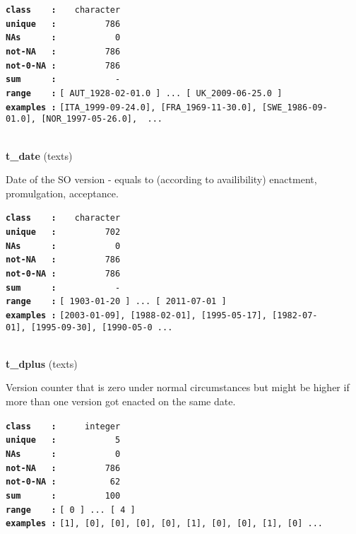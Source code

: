 \documentclass[]{article}
\begin{document}
\textbf{\texttt{class\ \ \ \ :}} \texttt{~~~character}\\
\textbf{\texttt{unique\ \ \ :}} \texttt{~~~~~~~~~786}\\
\textbf{\texttt{NAs\ \ \ \ \ \ :}} \texttt{~~~~~~~~~~~0}\\
\textbf{\texttt{not-NA\ \ \ :}} \texttt{~~~~~~~~~786}\\
\textbf{\texttt{not-0-NA\ :}} \texttt{~~~~~~~~~786}\\
\textbf{\texttt{sum\ \ \ \ \ \ :}} \texttt{~~~~~~~~~~~-}\\
\textbf{\texttt{range\ \ \ \ :}}
\texttt{{[}\ AUT\_1928-02-01.0\ {]}\ ...\ {[}\ UK\_2009-06-25.0\ {]}}\\
\textbf{\texttt{examples\ :}}
\texttt{{[}ITA\_1999-09-24.0{]},\ {[}FRA\_1969-11-30.0{]},\ {[}SWE\_1986-09-01.0{]},\ {[}NOR\_1997-05-26.0{]},\ \ ...}\\

~

\textbf{t\_date} (texts)

Date of the SO version - equals to (according to availibility)
enactment, promulgation, acceptance.

\textbf{\texttt{class\ \ \ \ :}} \texttt{~~~character}\\
\textbf{\texttt{unique\ \ \ :}} \texttt{~~~~~~~~~702}\\
\textbf{\texttt{NAs\ \ \ \ \ \ :}} \texttt{~~~~~~~~~~~0}\\
\textbf{\texttt{not-NA\ \ \ :}} \texttt{~~~~~~~~~786}\\
\textbf{\texttt{not-0-NA\ :}} \texttt{~~~~~~~~~786}\\
\textbf{\texttt{sum\ \ \ \ \ \ :}} \texttt{~~~~~~~~~~~-}\\
\textbf{\texttt{range\ \ \ \ :}}
\texttt{{[}\ 1903-01-20\ {]}\ ...\ {[}\ 2011-07-01\ {]}}\\
\textbf{\texttt{examples\ :}}
\texttt{{[}2003-01-09{]},\ {[}1988-02-01{]},\ {[}1995-05-17{]},\ {[}1982-07-01{]},\ {[}1995-09-30{]},\ {[}1990-05-0\ ...}\\

~

\textbf{t\_dplus} (texts)

Version counter that is zero under normal circumstances but might be
higher if more than one version got enacted on the same date.

\textbf{\texttt{class\ \ \ \ :}} \texttt{~~~~~integer}\\
\textbf{\texttt{unique\ \ \ :}} \texttt{~~~~~~~~~~~5}\\
\textbf{\texttt{NAs\ \ \ \ \ \ :}} \texttt{~~~~~~~~~~~0}\\
\textbf{\texttt{not-NA\ \ \ :}} \texttt{~~~~~~~~~786}\\
\textbf{\texttt{not-0-NA\ :}} \texttt{~~~~~~~~~~62}\\
\textbf{\texttt{sum\ \ \ \ \ \ :}} \texttt{~~~~~~~~~100}\\
\textbf{\texttt{range\ \ \ \ :}}
\texttt{{[}\ 0\ {]}\ ...\ {[}\ 4\ {]}}\\
\textbf{\texttt{examples\ :}}
\texttt{{[}1{]},\ {[}0{]},\ {[}0{]},\ {[}0{]},\ {[}0{]},\ {[}1{]},\ {[}0{]},\ {[}0{]},\ {[}1{]},\ {[}0{]}\ ...}\\
\end{document}
